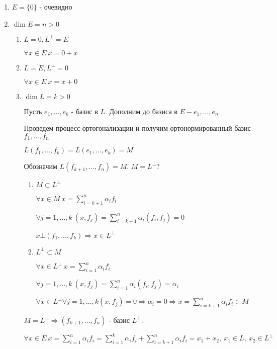 \begin{enumerate}
 \item $E = \{0\}$ - очевидно
 \item $\dim E = n > 0$
       \begin{enumerate}
        \item $L = 0, L^\bot = E$
        
	      $\forall x \in E ~ x = 0 + x$
	\item $L = E, L^\bot = 0$
        
	      $\forall x \in E ~ x = x + 0$
	\item $\dim L = k > 0$
	
	      Пусть $e_1,\ldots,e_k$ - базис в $L$.
	      Дополним до базиса в $E - e_1,\ldots,e_n$
	      
	      Проведем процесс ортогонализации и получим ортонормированный базис $f_1,\ldots, f_n$
	      
	      $L(f_1,\ldots,f_k) = L(e_1,\ldots,e_k) = M$
	      
	      Обозначим $L(f_{k+1},\ldots,f_n) = M$. $M = L^\bot$?
	      
	      \begin{enumerate}
	       \item $M\subset L^\bot$
	       
		     $\forall x \in M ~ x = \sum_{i=k+1}^n \alpha_i f_i$
		     
		     $\forall j = 1,\ldots,k ~ (x,f_j) = \sum_{i=k+1}^n \alpha_i (f_i,f_j) = 0$
		     
		     $x \bot (f_1,\ldots,f_k) \Rightarrow x \in L^\bot$
		     
	       \item $L^\bot \subset M$
		     
		     $\forall x \in L^\bot ~ x = \sum_{i=1}^n \alpha_i f_i$
		     
		     $\forall j = 1,\ldots,k ~ (x,f_j) = \sum_{i=1}^n \alpha_i (f_i,f_j) = \alpha_i$
		     
		     $\forall x \in L^\bot \forall j = 1,\ldots,k (x,f_j) = 0 \Rightarrow \alpha_i = 0 \Rightarrow x = \sum_{i=k+1}^n \alpha_i f_i \in M$
	      \end{enumerate}
	      $M = L^\bot \Rightarrow (f_{k+1},\ldots,f_n)$ - базис $L^\bot$.
	      
	      $\forall x \in E ~ x = \sum_{i=1}^n \alpha_i f_i = \sum_{i=1}^k \alpha_i f_i + \sum_{i=k+1}^n \alpha_i f_i = x_1 + x_2, ~ x_1 \in L, ~ x_2 \in L^\bot$
	\end{enumerate}

\end{enumerate}

